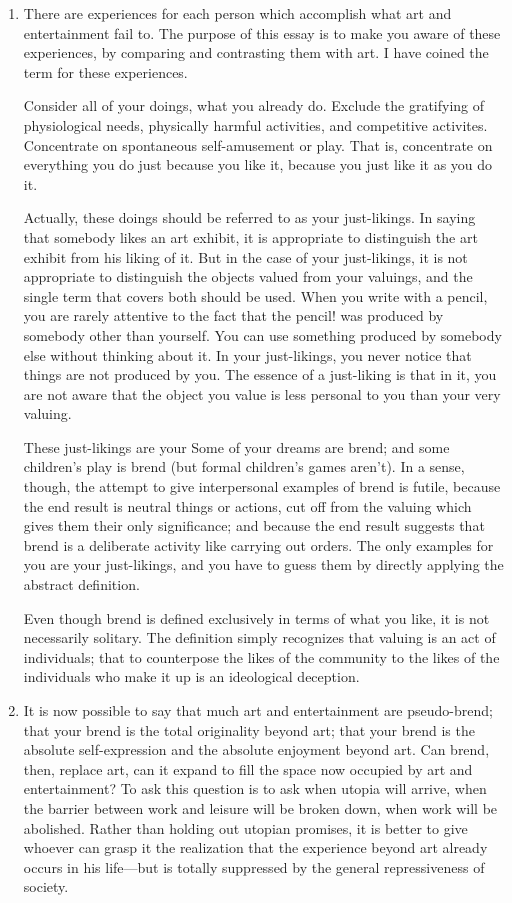 \documentclass[10pt,twoside]{memoir}
\begin{document}
\begin{enumerate}
{\begin{enumerate}
\item There are experiences for each person which accomplish what art and 
entertainment fail to. The purpose of this essay is to make you aware of 
these experiences, by comparing and contrasting them with art. I have 
coined the term  for these experiences. 

Consider all of your doings, what you already do. Exclude the gratifying of 
physiological needs, physically harmful activities, and competitive activites. 
Concentrate on spontaneous self-amusement or play. That is, concentrate on 
everything you do just because you like it, because you just like it as you do 
it. 

Actually, these doings should be referred to as your just-likings. In saying 
that somebody likes an art exhibit, it is appropriate to distinguish the art 
exhibit from his liking of it. But in the case of your just-likings, it is not 
appropriate to distinguish the objects valued from your valuings, and the 
single term that covers both should be used. When you write with a pencil, 
you are rarely attentive to the fact that the pencil! was produced by 
somebody other than yourself. You can use something produced by 
somebody else without thinking about it. In your just-likings, you never 
notice that things are not produced by you. The essence of a just-liking is 
that in it, you are not aware that the object you value is less personal to you 
than your very valuing. 

These just-likings are your  Some of your dreams are brend; and 
some children's play is brend (but formal children's games aren't). In a sense, 
though, the attempt to give interpersonal examples of brend is futile, 
because the end result is neutral things or actions, cut off from the valuing 
which gives them their only significance; and because the end result suggests 
that brend is a deliberate activity like carrying out orders. The only examples 
for you are your just-likings, and you have to guess them by directly 
applying the abstract definition. 

Even though brend is defined exclusively in terms of what you like, it is not 
necessarily solitary. The definition simply recognizes that valuing is an act of 
individuals; that to counterpose the likes of the community to the likes of 
the individuals who make it up is an ideological deception. 

\item It is now possible to say that much art and entertainment are 
pseudo-brend; that your brend is the total originality beyond art; that your 
brend is the absolute self-expression and the absolute enjoyment beyond art. 
Can brend, then, replace art, can it expand to fill the space now occupied by 
art and entertainment? To ask this question is to ask when utopia will 
arrive, when the barrier between work and leisure will be broken down, 
when work will be abolished. Rather than holding out utopian promises, it is 
better to give whoever can grasp it the realization that the experience 
beyond art already occurs in his life---but is totally suppressed by the general 
repressiveness of society. 



\end{enumerate}}
\end{enumerate}
\end{document}
